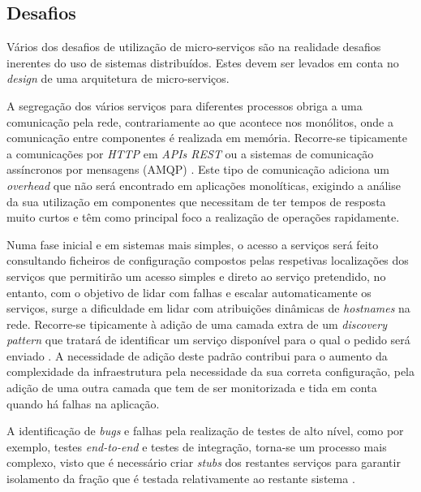        
    
    
\subsection{Desafios}   

    Vários dos desafios de utilização de micro-serviços são na realidade desafios inerentes do uso de sistemas distribuídos. Estes devem ser levados em conta no  \textit{design} de uma arquitetura de micro-serviços.
    
    
    
    A segregação dos vários serviços para diferentes processos obriga a uma comunicação pela rede, contrariamente ao que acontece nos monólitos, onde a comunicação entre componentes é realizada em memória. Recorre-se tipicamente a comunicações por \textit{HTTP} em \textit{APIs REST} ou a sistemas de comunicação assíncronos por mensagens (AMQP) \citep{communication_microservice_architecture_microsoft}.
    Este tipo de comunicação adiciona um \textit{overhead} que não será encontrado em aplicações monolíticas, exigindo a análise da sua utilização em componentes que necessitam de ter tempos de resposta muito curtos e têm como principal foco a realização de operações rapidamente.
    
    Numa fase inicial e em sistemas mais simples, o acesso a serviços será feito consultando ficheiros de configuração compostos pelas respetivas localizações dos serviços que permitirão um acesso simples e direto ao serviço pretendido, no entanto, com o objetivo de lidar com falhas e escalar automaticamente os serviços, surge a dificuldade em lidar com atribuições dinâmicas de \textit{hostnames} na rede. Recorre-se tipicamente à adição de uma camada extra de um \textit{discovery pattern} que tratará de identificar um serviço disponível para o qual o pedido será enviado \citep{richardson15_service_discovery}. A necessidade de adição deste padrão contribui para o aumento da complexidade da infraestrutura pela necessidade da sua correta configuração, pela adição de uma outra camada que tem de ser monitorizada e tida em conta quando há falhas na aplicação. 
    
    A identificação de \textit{bugs} e falhas pela realização de testes de alto nível, como por exemplo, testes \textit{end-to-end} e testes de integração, torna-se um processo mais complexo, visto que é necessário criar \textit{stubs} dos restantes serviços para garantir isolamento da fração que é testada relativamente ao restante sistema \cite{newman2015microservices}.
    
